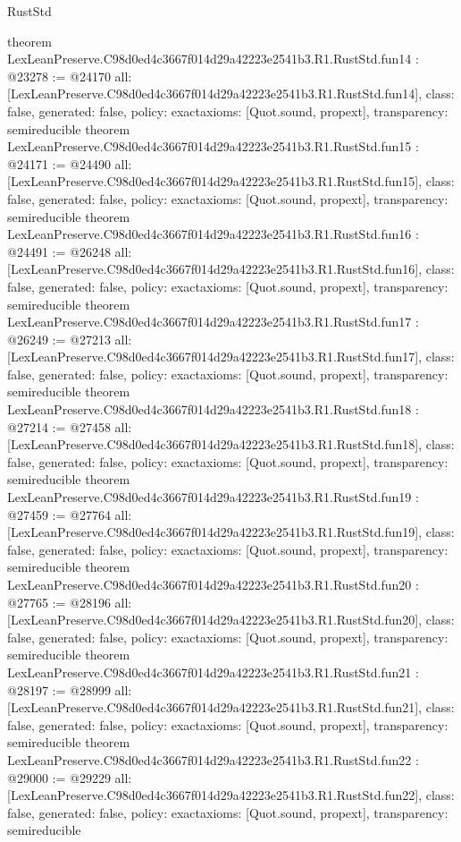 \begin{lexlean}{RustStd}
\begin{coremodule}
{}
theorem LexLeanPreserve.C98d0ed4c3667f014d29a42223e2541b3.R1.RustStd.fun14 : @23278 := @24170 {
  all: [LexLeanPreserve.C98d0ed4c3667f014d29a42223e2541b3.R1.RustStd.fun14],
  class: false,
  generated: false,
  policy: exact{axioms: [Quot.sound, propext]},
  transparency: semireducible
}
theorem LexLeanPreserve.C98d0ed4c3667f014d29a42223e2541b3.R1.RustStd.fun15 : @24171 := @24490 {
  all: [LexLeanPreserve.C98d0ed4c3667f014d29a42223e2541b3.R1.RustStd.fun15],
  class: false,
  generated: false,
  policy: exact{axioms: [Quot.sound, propext]},
  transparency: semireducible
}
theorem LexLeanPreserve.C98d0ed4c3667f014d29a42223e2541b3.R1.RustStd.fun16 : @24491 := @26248 {
  all: [LexLeanPreserve.C98d0ed4c3667f014d29a42223e2541b3.R1.RustStd.fun16],
  class: false,
  generated: false,
  policy: exact{axioms: [Quot.sound, propext]},
  transparency: semireducible
}
theorem LexLeanPreserve.C98d0ed4c3667f014d29a42223e2541b3.R1.RustStd.fun17 : @26249 := @27213 {
  all: [LexLeanPreserve.C98d0ed4c3667f014d29a42223e2541b3.R1.RustStd.fun17],
  class: false,
  generated: false,
  policy: exact{axioms: [Quot.sound, propext]},
  transparency: semireducible
}
theorem LexLeanPreserve.C98d0ed4c3667f014d29a42223e2541b3.R1.RustStd.fun18 : @27214 := @27458 {
  all: [LexLeanPreserve.C98d0ed4c3667f014d29a42223e2541b3.R1.RustStd.fun18],
  class: false,
  generated: false,
  policy: exact{axioms: [Quot.sound, propext]},
  transparency: semireducible
}
theorem LexLeanPreserve.C98d0ed4c3667f014d29a42223e2541b3.R1.RustStd.fun19 : @27459 := @27764 {
  all: [LexLeanPreserve.C98d0ed4c3667f014d29a42223e2541b3.R1.RustStd.fun19],
  class: false,
  generated: false,
  policy: exact{axioms: [Quot.sound, propext]},
  transparency: semireducible
}
theorem LexLeanPreserve.C98d0ed4c3667f014d29a42223e2541b3.R1.RustStd.fun20 : @27765 := @28196 {
  all: [LexLeanPreserve.C98d0ed4c3667f014d29a42223e2541b3.R1.RustStd.fun20],
  class: false,
  generated: false,
  policy: exact{axioms: [Quot.sound, propext]},
  transparency: semireducible
}
theorem LexLeanPreserve.C98d0ed4c3667f014d29a42223e2541b3.R1.RustStd.fun21 : @28197 := @28999 {
  all: [LexLeanPreserve.C98d0ed4c3667f014d29a42223e2541b3.R1.RustStd.fun21],
  class: false,
  generated: false,
  policy: exact{axioms: [Quot.sound, propext]},
  transparency: semireducible
}
theorem LexLeanPreserve.C98d0ed4c3667f014d29a42223e2541b3.R1.RustStd.fun22 : @29000 := @29229 {
  all: [LexLeanPreserve.C98d0ed4c3667f014d29a42223e2541b3.R1.RustStd.fun22],
  class: false,
  generated: false,
  policy: exact{axioms: [Quot.sound, propext]},
  transparency: semireducible
}
\end{coremodule}
\end{lexlean}
